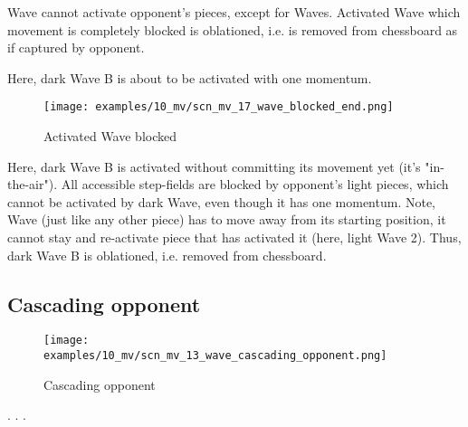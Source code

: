 Wave cannot activate opponent's pieces, except for Waves. Activated Wave which movement
is completely blocked is oblationed, i.e. is removed from chessboard as if captured by
opponent.

Here, dark Wave B is about to be activated with one momentum.

\clearpage %

\vspace*{-5.0ex}
\noindent
\begin{figure}[h]
\texttt{[image: examples/10\_mv/scn\_mv\_17\_wave\_blocked\_end.png]}
\caption{Activated Wave blocked}
\label{fig:scn_mv_17_wave_blocked_end}
\end{figure}

Here, dark Wave B is activated without committing its movement yet (it's "in-the-air").
All accessible step-fields are blocked by opponent's light pieces, which cannot be
activated by dark Wave, even though it has one momentum.
Note, Wave (just like any other piece) has to move away from its starting position,
it cannot stay and re-activate piece that has activated it (here, light Wave 2).
Thus, dark Wave B is oblationed, i.e. removed from chessboard.

\clearpage %

\subsection*{Cascading opponent}

\vspace*{-3.0ex}
\noindent
\begin{figure}[h]
\texttt{[image: examples/10\_mv/scn\_mv\_13\_wave\_cascading\_opponent.png]}
\caption{Cascading opponent}
\label{fig:scn_mv_13_wave_cascading_opponent}
\end{figure}

. . .




